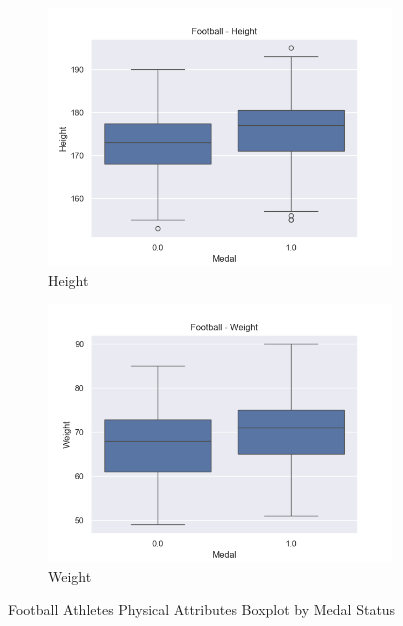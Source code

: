 \documentclass{article}
\begin{document}
\begin{figure}[H]
    \begin{subfigure}[b]{0.49\textwidth}
        \centering
        \includegraphics[width=\linewidth]{images/physical_attributes_graphs/Football_Height.png} 
        \caption{Height}
        \label{fig:image1}
    \end{subfigure}
    \begin{subfigure}[b]{0.49\textwidth}
        \centering
        \includegraphics[width=\linewidth]{images/physical_attributes_graphs/Football_Weight.png}  
        \caption{Weight}
        \label{fig:image2}
    \end{subfigure}
    \caption{Football Athletes Physical Attributes Boxplot by Medal Status}
    
    \label{fig:sidebyside}
\end{figure}
\end{document}
